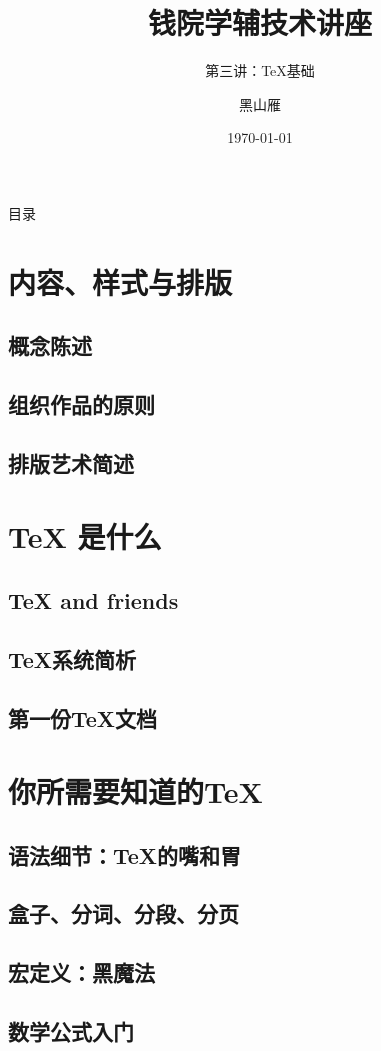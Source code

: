 \documentclass{beamer}
\title[Tech Lec]{钱院学辅技术讲座}
\subtitle{第三讲：\TeX 基础}
\author[xjtu-blacksmith]{黑山雁}
\institute[Xi'an Jiaotong University]
{
  西安交通大学
}
\date{\today}
\begin{document}
\begin{frame}
\maketitle
\end{frame}

\begin{frame}{目录}
    \tableofcontents
\end{frame}

\section{内容、样式与排版}
\subsection{概念陈述}
\subsection{组织作品的原则}
\subsection{排版艺术简述}

\section{\TeX{} 是什么}
\subsection{\TeX{} and friends}
\subsection{\TeX 系统简析}
\subsection{第一份\TeX 文档}


\section{你所需要知道的\TeX}
\subsection{语法细节：\TeX 的嘴和胃}
\subsection{盒子、分词、分段、分页}
\subsection{宏定义：黑魔法}
\subsection{数学公式入门}
\end{document}
